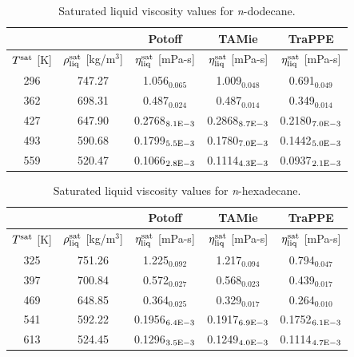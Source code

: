 \documentclass[preprint,review,11pt]{elsarticle}
\begin{document}
	\begin{table}[H]
		\caption{Saturated liquid viscosity values for \textit{n}-dodecane.}
		\begin{center}
			\begin{tabular}{|c|c|c|c|c|}
				\hline
				&                                       & Potoff            & TAMie             & TraPPE            \\ \hline
				$T^{\rm sat}$ {[}K{]} & $\rho^{\rm sat}_{\rm liq}$ [kg/m$^3$] & $\eta_{\rm liq}^{\rm sat}$ {[}mPa-s{]} & $\eta_{\rm liq}^{\rm sat}$ {[}mPa-s{]} & $\eta_{\rm liq}^{\rm sat}$ {[}mPa-s{]} \\ \hline
				296 & 747.27 & 1.056$_{0.065}$   & 1.009$_{0.048}$   & 0.691$_{0.049}$   \\ \hline
				362 & 698.31 & 0.487$_{0.024}$   & 0.487$_{0.014}$   & 0.349$_{0.014}$   \\ \hline
				427 & 647.90 & 0.2768$_{8.1 \rm E-3}$ & 0.2868$_{8.7 \rm E-3}$ & 0.2180$_{7.0 \rm E-3}$ \\ \hline
				493 & 590.68 & 0.1799$_{5.5 \rm E-3}$ & 0.1780$_{7.0 \rm E-3}$ & 0.1442$_{5.0 \rm E-3}$ \\ \hline
				559 & 520.47 & 0.1066$_{2.8 \rm E-3}$ & 0.1114$_{4.3 \rm E-3}$ & 0.0937$_{2.1 \rm E-3}$ \\ \hline
			\end{tabular}
		\end{center}
	\end{table}
	
	\begin{table}[H]
		\caption{Saturated liquid viscosity values for \textit{n}-hexadecane.}
		\begin{center}
			\begin{tabular}{|c|c|c|c|c|}
				\hline
				&                                       & Potoff            & TAMie             & TraPPE            \\ \hline
				$T^{\rm sat}$ {[}K{]} & $\rho^{\rm sat}_{\rm liq}$ [kg/m$^3$] & $\eta_{\rm liq}^{\rm sat}$ {[}mPa-s{]} & $\eta_{\rm liq}^{\rm sat}$ {[}mPa-s{]} & $\eta_{\rm liq}^{\rm sat}$ {[}mPa-s{]} \\ \hline
				325 & 751.26 & 1.225$_{0.092}$   & 1.217$_{0.094}$   & 0.794$_{0.047}$   \\ \hline
				397 & 700.84 & 0.572$_{0.027}$   & 0.568$_{0.023}$   & 0.439$_{0.017}$   \\ \hline
				469 & 648.85 & 0.364$_{0.025}$   & 0.329$_{0.017}$   & 0.264$_{0.010}$   \\ \hline
				541 & 592.22 & 0.1956$_{6.4 \rm E-3}$ & 0.1917$_{6.9 \rm E-3}$ & 0.1752$_{6.1 \rm E-3}$ \\ \hline
				613 & 524.45 & 0.1296$_{3.5 \rm E-3}$ & 0.1249$_{4.0 \rm E-3}$ & 0.1114$_{4.7 \rm E-3}$ \\ \hline
			\end{tabular}
		\end{center}
	\end{table}
	
\end{document}
